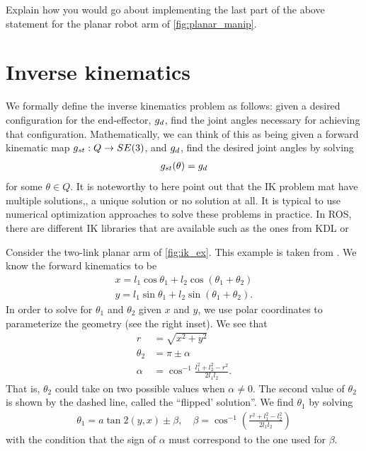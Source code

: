 \begin{homework}
	Explain how you would go about implementing the last part of the above statement for the planar robot arm of \autoref{fig:planar_manip}.
\end{homework}

\section{Inverse kinematics}
%
We formally define the inverse kinematics problem as follows: given a desired configuration for the end-effector, $g_d$, find the joint angles necessary for achieving that configuration. Mathematically, we can think of this as being given a forward kinematic map $g_{st}: Q \rightarrow SE(3)$, and $g_d$, find the desired joint angles by solving 
%
\begin{align}
	g_{st}(\theta) = g_d
\end{align}
%
for some $\theta \in Q$. It is noteworthy to here point out that the IK problem mat have multiple solutions,, a unique solution or no solution at all. It is typical to use numerical optimization approaches to solve these problems in practice. In ROS, there are different IK libraries that are available such as the ones from \textsc{KDL} or 

\begin{example}
	Consider the two-link planar arm of \autoref{fig:ik_ex}. This example is taken from \cite{MurrayBook}. We know the forward kinematics to be 
	\begin{align}
		x = l_1 \cos \theta_1 + l_2 \cos(\theta_1 + \theta_2) \nonumber \\
		y = l_1 \sin \theta_1 + l_2 \sin(\theta_1 + \theta_2).
	\end{align}
	In order to solve for $\theta_1$ and $\theta_2$ given $x$ and $y$, we use polar coordinates to parameterize the geometry (see the right inset). We see that 
	\begin{subequations}
		\begin{align}
			r &= \sqrt{x^2 + y^2} \\
			\theta_2 &= \pi \pm \alpha \\
			\alpha &= \cos^{-1} \frac{l_1^2 + l_2^2- r^2}{2 l_1 l_2}.
		\end{align}
	\end{subequations}
	That is, $\theta_2$ could take on two possible values when $\alpha \neq 0$. The second value of $\theta_2$ is shown by the dashed line, called the ``flipped' solution''. We find $\theta_1$ by solving
	\begin{align}
	\theta_1 = a\tan2(y,x) \pm \beta, \quad \beta = \cos^{-1}\left(\frac{r^2 + l_1^2 - l_2^2}{2 l_1l_2}\right)
	\end{align}
	with the condition that the sign of $\alpha$ must correspond to the one used for $\beta$.
\end{example}


